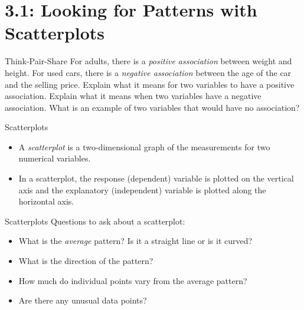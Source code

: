 \documentclass[Lecture.tex]{subfiles}
\begin{document}
\section{3.1: Looking for Patterns with Scatterplots}



\begin{frame}{Think-Pair-Share}
 For adults, there is a {\it positive association} between weight and height.  For used cars, there is a {\it negative association} between the age of the car and the selling price.  Explain what it means for two variables to have a positive association.  Explain what it means when two variables have a negative association.  What is an example of two variables that would have no association?
\end{frame}

\begin{frame}{Scatterplots}
\begin{defn}
\begin{itemize}
\item<1->
A {\it scatterplot} is a two-dimensional graph of the measurements for two numerical variables.
\item<2->
In a scatterplot, the response (dependent) variable is plotted on the vertical axis and the explanatory (independent) variable is plotted along the horizontal axis.
\end{itemize}
\end{defn}
\end{frame}

\begin{frame}{Scatterplots}
Questions to ask about a scatterplot:
\begin{itemize}
\item<1->
What is the {\it average} pattern? Is it a straight line or is it curved?
\item<2->
What is the direction of the pattern?
\item<3->
How much do individual points vary from the average pattern?
\item<4->
Are there any unusual data points?
\end{itemize}
\end{frame}
\end{document}
